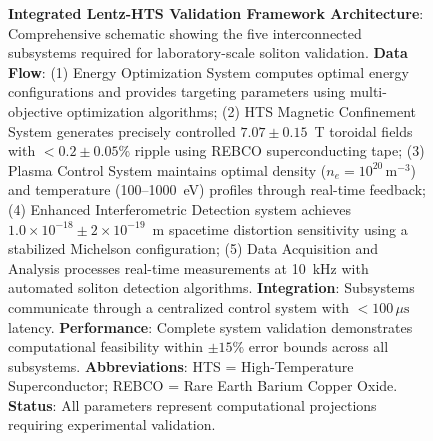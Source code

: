 \documentclass[12pt,a4paper]{article}
\begin{document}
\begin{figure}[htbp]
\centering
{}
\caption{\textbf{Integrated Lentz-HTS Validation Framework Architecture}: Comprehensive schematic showing the five interconnected subsystems required for laboratory-scale soliton validation. \textbf{Data Flow}: (1) Energy Optimization System computes optimal energy configurations and provides targeting parameters using multi-objective optimization algorithms; (2) HTS Magnetic Confinement System generates precisely controlled $7.07\pm0.15$~T toroidal fields with $<0.2\pm0.05\%$ ripple using REBCO superconducting tape; (3) Plasma Control System maintains optimal density ($n_e = 10^{20}\,\mathrm{m}^{-3}$) and temperature (100--1000~eV) profiles through real-time feedback; (4) Enhanced Interferometric Detection system achieves $1.0\times10^{-18}\pm2\times10^{-19}$~m spacetime distortion sensitivity using a stabilized Michelson configuration; (5) Data Acquisition and Analysis processes real-time measurements at 10~kHz with automated soliton detection algorithms. \textbf{Integration}: Subsystems communicate through a centralized control system with $<100\,\mu\mathrm{s}$ latency. \textbf{Performance}: Complete system validation demonstrates computational feasibility within $\pm15\%$ error bounds across all subsystems. \textbf{Abbreviations}: HTS = High-Temperature Superconductor; REBCO = Rare Earth Barium Copper Oxide. \textbf{Status}: All parameters represent computational projections requiring experimental validation.}
\label{fig:framework}
\end{figure}
\end{document}
